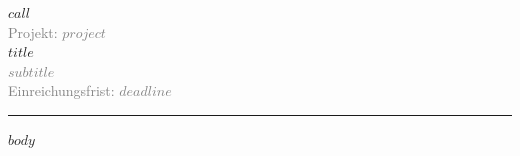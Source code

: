 \documentclass[11pt, a4paper]{scrartcl}
\begin{document}
\begin{center}
  {\small\textcolor{accent}{\MakeUppercase{$call$}}}\\[2mm]
  {\small\textcolor{gray}{Projekt: $project$}}\\[8mm]
  {\LARGE\bfseries\textcolor{primary}{$title$}}\\[3mm]
  {\large\textcolor{gray}{$subtitle$}}\\[2mm]
  {\small\textcolor{gray}{Einreichungsfrist: $deadline$}}
\end{center}

\vspace{2mm}
\noindent\rule{\textwidth}{1.5pt}
\vspace{4mm}

$body$
\end{document}
